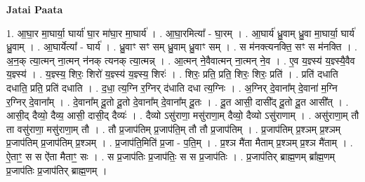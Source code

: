 \documentclass[17pt]{extarticle}
\begin{document}
\textbf{Jatai Paata} \newline

1. आ॒घा॒र मा॒घार्या॒ घार्या॑ घा॒र मा॑घा॒र मा॒घार्य॑ । . आ॒घा॒रमित्या᳚ - घा॒रम् । . आ॒घार्य॑ ध्रु॒वाम् ध्रु॒वा मा॒घार्या॒ घार्य॑ ध्रु॒वाम् । . आ॒घार्येत्या᳚ - घार्य॑ । . ध्रु॒वाꣳ सꣳ सम् ध्रु॒वाम् ध्रु॒वाꣳ सम् । . स म॑नक्त्यनक्ति॒ सꣳ स म॑नक्ति । . अ॒न॒क् त्या॒त्मन् ना॒त्मन् न॑नक् त्यनक् त्या॒त्मन्न् । . आ॒त्मन् ने॒वैवात्मन् ना॒त्मन् ने॒व । . ए॒व य॒ज्ञ्स्य॑ य॒ज्ञ्स्यै॒वैव य॒ज्ञ्स्य॑ । . य॒ज्ञ्स्य॒ शिरः॒ शिरो॑ य॒ज्ञ्स्य॑ य॒ज्ञ्स्य॒ शिरः॑ । . शिरः॒ प्रति॒ प्रति॒ शिरः॒ शिरः॒ प्रति॑ । . प्रति॑ दधाति दधाति॒ प्रति॒ प्रति॑ दधाति । . द॒धा॒ त्य॒ग्नि र॒ग्निर् द॑धाति दधा त्य॒ग्निः । . अ॒ग्निर् दे॒वाना᳚म् दे॒वाना॑ म॒ग्नि र॒ग्निर् दे॒वाना᳚म् । . दे॒वाना᳚म् दू॒तो दू॒तो दे॒वाना᳚म् दे॒वाना᳚म् दू॒तः । . दू॒त आसी॒ दासी᳚द् दू॒तो दू॒त आसी᳚त् । . आसी॒द् दैव्यो॒ दैव्य॒ आसी॒ दासी॒द् दैव्यः॑ । . दैव्यो ऽसु॑राणा॒ मसु॑राणा॒म् दैव्यो॒ दैव्यो ऽसु॑राणाम् । . असु॑राणा॒म् तौ ता वसु॑राणा॒ मसु॑राणा॒म् तौ । . तौ प्र॒जाप॑तिम् प्र॒जाप॑ति॒म् तौ तौ प्र॒जाप॑तिम् । . प्र॒जाप॑तिम् प्र॒श्ञम् प्र॒श्ञम् प्र॒जाप॑तिम् प्र॒जाप॑तिम् प्र॒श्ञम् । . प्र॒जाप॑ति॒मिति॑ प्र॒जा - प॒ति॒म् । . प्र॒श्ञ मै॑ता मैताम् प्र॒श्ञम् प्र॒श्ञ मै॑ताम् । . ऐ॒ताꣳ॒॒ स स ऐ॑ता मैताꣳ॒॒ सः । . स प्र॒जाप॑तिः प्र॒जाप॑तिः॒ स स प्र॒जाप॑तिः । . प्र॒जाप॑तिर् ब्राह्म॒णम् ब्रा᳚ह्म॒णम् प्र॒जाप॑तिः प्र॒जाप॑तिर् ब्राह्म॒णम् । \newline
\end{document}
